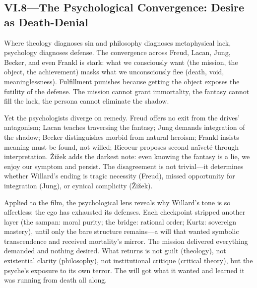 \subsection*{VI.8—The Psychological Convergence: Desire as Death-Denial}
\label{ssec:vi-synthesis}

Where theology diagnoses sin and philosophy diagnoses metaphysical lack, psychology diagnoses
defense. The convergence across Freud, Lacan, Jung, Becker, and even Frankl is stark: what we
consciously want (the mission, the object, the achievement) masks what we unconsciously flee
(death, void, meaninglessness). Fulfillment punishes because getting the object exposes the
futility of the defense. The mission cannot grant immortality, the fantasy cannot fill the
lack, the persona cannot eliminate the shadow.

Yet the psychologists diverge on remedy. Freud offers no exit from the drives' antagonism;
Lacan teaches traversing the fantasy; Jung demands integration of the shadow; Becker
distinguishes morbid from natural heroism; Frankl insists meaning must be found, not willed;
Ricoeur proposes second naïveté through interpretation. {\v{Z}}i{\v{z}}ek adds the darkest
note: even knowing the fantasy is a lie, we enjoy our symptom and persist. The disagreement is
not trivial---it determines whether Willard's ending is tragic necessity (Freud), missed
opportunity for integration (Jung), or cynical complicity ({\v{Z}}i{\v{z}}ek).

Applied to the film, the psychological lens reveals why Willard's tone is so affectless: the
ego has exhausted its defenses. Each checkpoint stripped another layer (the sampan: moral
purity; the bridge: rational order; Kurtz: sovereign mastery), until only the bare structure
remains---a will that wanted symbolic transcendence and received mortality's mirror. The
mission delivered everything demanded and nothing desired. What returns is not guilt
(theology), not existential clarity (philosophy), not institutional critique (critical theory),
but the psyche's exposure to its own terror. The will got what it wanted and learned it was
running from death all along.
